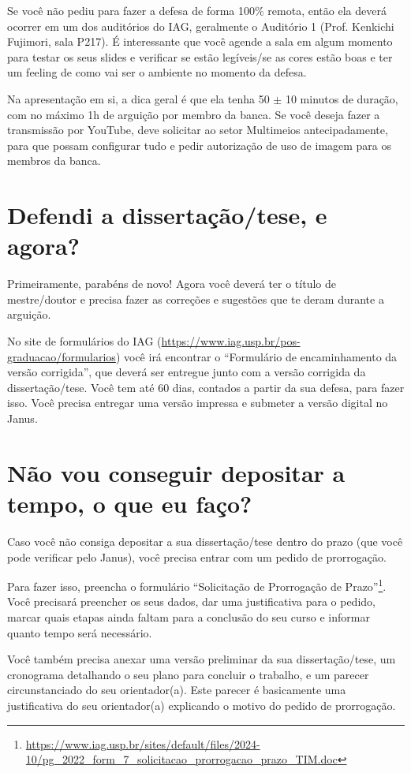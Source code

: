       Se você não pediu para fazer a defesa de forma 100\% remota, então ela deverá ocorrer em um dos auditórios do IAG, geralmente o Auditório 1 (Prof. Kenkichi Fujimori, sala P217). É interessante que você agende a sala em algum momento para testar os seus slides e verificar se estão legíveis/se as cores estão boas e ter um feeling de como vai ser o ambiente no momento da defesa.

      Na apresentação em si, a dica geral é que ela tenha 50 $\pm$ 10 minutos de duração, com no máximo 1h de arguição por membro da banca. Se você deseja fazer a transmissão por YouTube, deve solicitar ao setor Multimeios antecipadamente, para que possam configurar tudo e pedir autorização de uso de imagem para os membros da banca.

  \section{Defendi a dissertação/tese, e agora?}

    Primeiramente, parabéns de novo! Agora você deverá ter o título de mestre/doutor e precisa fazer as correções e sugestões que te deram durante a arguição.

    No site de formulários do IAG (\url{https://www.iag.usp.br/pos-graduacao/formularios}) você irá encontrar o ``Formulário de encaminhamento da versão corrigida'', que deverá ser entregue junto com a versão corrigida da dissertação/tese. Você tem até 60 dias, contados a partir da sua defesa, para fazer isso. Você precisa entregar uma versão impressa e submeter a versão digital no Janus.

  \section{Não vou conseguir depositar a tempo, o que eu faço?}

    Caso você não consiga depositar a sua dissertação/tese dentro do prazo (que você pode verificar pelo Janus), você precisa entrar com um pedido de prorrogação.

    Para fazer isso, preencha o formulário ``Solicitação de Prorrogação de Prazo''\footnote{\url{https://www.iag.usp.br/sites/default/files/2024-10/pg_2022_form_7_solicitacao_prorrogacao_prazo_TIM.doc}}. Você precisará preencher os seus dados, dar uma justificativa para o pedido, marcar quais etapas ainda faltam para a conclusão do seu curso e informar quanto tempo será necessário.

    Você também precisa anexar uma versão preliminar da sua dissertação/tese, um cronograma detalhando o seu plano para concluir o trabalho, e um parecer circunstanciado do seu orientador(a). Este parecer é basicamente uma justificativa do seu orientador(a) explicando o motivo do pedido de prorrogação.

